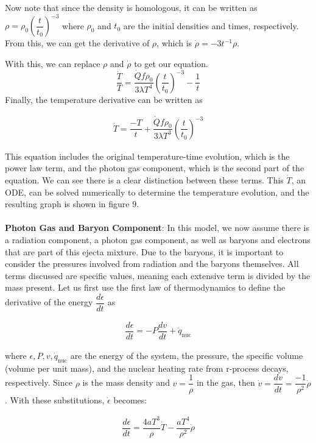 \documentclass[11pt,a4paper]{article}
\begin{document}
Now note that since the density is homologous, it can be written as $ \rho = \rho_0 \left(\dfrac{t}{t_0} \right)^{-3} $ where $\rho_0$ and $t_0$ are the initial densities and times, respectively. From this, we can get the derivative of $\rho$, which is $ \dot{\rho} = -3t^{-1} \rho $. 

With this, we can replace $\rho$ and $\dot{\rho}$ to get our equation.
$$ \dfrac{\dot{T}}{T} = \dfrac{\dot{Q} f \rho_0}{3 \lambda T^4} \left( \dfrac{t}{t_0} \right) ^{-3} - \dfrac{1}{t} $$ Finally, the temperature derivative can be written as 

\begin{align}
	\dot{T} = \dfrac{-T}{t} + \dfrac{\dot{Q} f \rho_0}{3 \lambda T^3} 	\left( \dfrac{t}{t_0} \right) ^{-3} 
\end{align}

This equation includes the original temperature-time evolution, which is the power law term, and the photon gas component, which is the second part of the equation. We can see there is a clear distinction between these terms.  This 
$\dot{T}$, an ODE, can be solved numerically to determine the temperature evolution, and the resulting graph is shown in figure 9.
\\\\

\textbf{Photon Gas and Baryon Component}: In this model, we now assume there is a radiation component, a photon gas component, as well as baryons and electrons that are part of this ejecta mixture. Due to the baryons, it is important to consider the pressures involved from radiation and the baryons themselves. All terms discussed are specific values, meaning each extensive term is divided by the mass present. Let us first use the first law of thermodynamics to define the derivative of the energy $\dfrac{d \epsilon}{dt}$ as

\begin{align}
	\dfrac{d \epsilon}{dt} = -P \dfrac{dv}{dt} + \dot{q}_\mathrm{nuc}
\end{align}

where $\epsilon, P, v, \dot{q}_\mathrm{nuc}$ are the energy of the system, the pressure, the specific volume (volume per unit mass), and the nuclear heating rate from r-process decays, respectively. Since $\rho$ is the mass density and $ v = \dfrac{1}{\rho} $ in the gas, then $ \dot{v} = \dfrac{dv}{dt} =  \dfrac{-1}{\rho ^2}\dot{\rho} $. With these substitutions, $\dot{\epsilon}$ becomes: 

\begin{align}
	\dfrac{d \epsilon}{dt} = \dfrac{4a T^3}{\rho} \dot{T} - 			\dfrac{a T^4}{\rho^2}\dot{\rho} 
\end{align}
\end{document}
